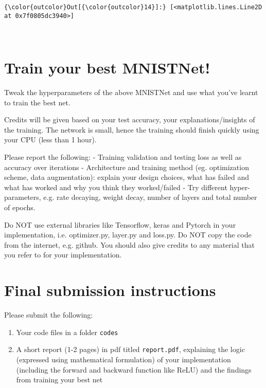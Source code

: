 \documentclass[11pt]{article}
\begin{document}
\begin{Verbatim}[commandchars=\\\{\}]
{\color{outcolor}Out[{\color{outcolor}14}]:} [<matplotlib.lines.Line2D at 0x7f0805dc3940>]
\end{Verbatim}
            
    \begin{center}
    \end{center}
    { \hspace*{\fill} \\}
    
    \section{Train your best MNISTNet!}\label{train-your-best-mnistnet}

Tweak the hyperparameters of the above MNISTNet and use what you've
learnt to train the best net.

Credits will be given based on your test accuracy, your
explanations/insights of the training. The network is small, hence the
training should finish quickly using your CPU (less than 1 hour).

Please report the following: - Training validation and testing loss as
well as accuracy over iterations - Architecture and training method (eg.
optimization scheme, data augmentation): explain your design choices,
what has failed and what has worked and why you think they worked/failed
- Try different hyper-parameters, e.g. rate decaying, weight decay,
number of layers and total number of epochs.

Do NOT use external libraries like Tensorflow, keras and Pytorch in your
implementation, i.e. optimizer.py, layer.py and loss.py. Do NOT copy the
code from the internet, e.g. github. You should also give credits to any
material that you refer to for your implementation.

    \section{Final submission
instructions}\label{final-submission-instructions}

Please submit the following:

\begin{enumerate}
\def\labelenumi{\arabic{enumi})}
\item
  Your code files in a folder \texttt{codes}
\item
  A short report (1-2 pages) in pdf titled \texttt{report.pdf},
  explaining the logic (expressed using mathematical formulation) of
  your implementation (including the forward and backward function like
  ReLU) and the findings from training your best net
\end{enumerate}
\end{document}
